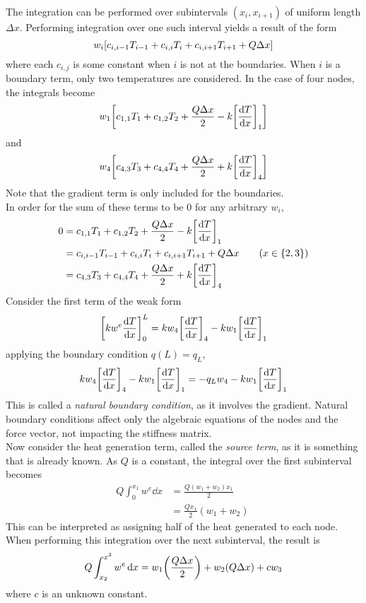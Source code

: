 \documentclass{article}
\begin{document}
			The integration can be performed over subintervals \((x_i, x_{i + 1})\) of uniform length \(\Delta x\). Performing integration over one such interval yields a result of the form
				\[w_i\qty[c_{i, i - 1}T_{i - 1} + c_{i, i}T_i + c_{i, i + 1}T_{i + 1} + Q\Delta x]\]
			where each \(c_{i, j}\) is some constant when \(i\) is not at the boundaries. When \(i\) is a boundary term, only two temperatures are considered. In the case of four nodes, the integrals become
				\[w_1\qty[c_{1, 1}T_1 + c_{1, 2}T_2 + \frac{Q\Delta x}{2} - k\qty[\dv{T}{x}]_1]\]
			and
				\[w_4\qty[c_{4, 3}T_3 + c_{4, 4}T_4 + \frac{Q\Delta x}{2} + k\qty[\dv{T}{x}]_4]\]
			Note that the gradient term is only included for the boundaries. \\
			In order for the sum of these terms to be 0 for any arbitrary \(w_i\),
				\begin{align*}
					0 &= c_{1, 1}T_1 + c_{1, 2}T_2 + \frac{Q\Delta x}{2} - k\qty[\dv{T}{x}]_1 \\
						&= c_{i, i - 1}T_{i - 1} + c_{i, i}T_i + c_{i, i + 1}T_{i + 1} + Q\Delta x \tag{\(x \in \{2, 3\}\)}\\
						&= c_{4, 3}T_3 + c_{4, 4}T_4 + \frac{Q\Delta x}{2} + k\qty[\dv{T}{x}]_4
				\end{align*}
			Consider the first term of the weak form
				\[\qty[kw^e\dv{T}{x}]_0^L = kw_4\qty[\dv{T}{x}]_4 - kw_1\qty[\dv{T}{x}]_1\]
			applying the boundary condition \(q(L) = q_L\),
				\[kw_4\qty[\dv{T}{x}]_4 - kw_1\qty[\dv{T}{x}]_1 = -q_Lw_4 - kw_1\qty[\dv{T}{x}]_1\]
			This is called a \textit{natural boundary condition}, as it involves the gradient. Natural boundary conditions affect only the algebraic equations of the nodes and the force vector, not impacting the stiffness matrix. \\
			Now consider the heat generation term, called the \textit{source term}, as it is something that is already known. As \(Q\) is a constant, the integral over the first subinterval becomes
				\begin{align*}
					Q\int_0^{x_1} w^e \dd{x} &= \frac{Q(w_1 + w_2)x_1}{2} \\
						&= \frac{Qx_1}{2}(w_1 + w_2)\
				\end{align*}
			This can be interpreted as assigning half of the heat generated to each node. \\
			When performing this integration over the next subinterval, the result is
				\[Q\int_{x_2}^{x^3} w^e \dd{x} = w_1\qty(\frac{Q\Delta x}{2}) + w_2(Q\Delta x) + cw_3\]
			where \(c\) is an unknown constant. \\
\end{document}

